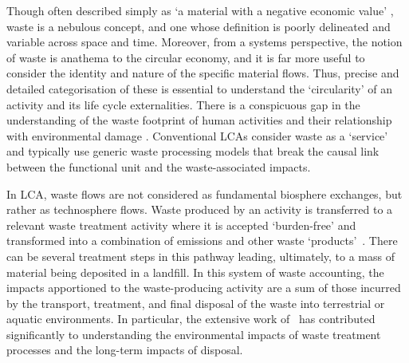 Though often described simply as `a material with a negative economic value' \citep{guinee2004economicallocation}, waste is a nebulous concept, and one whose definition is poorly delineated and variable across space and time.  Moreover, from a systems perspective, the notion of waste is anathema to the circular economy, and it is far more useful to consider the identity and nature of the specific material flows. Thus, precise and detailed categorisation of these is essential to understand the `circularity' of an activity and its life cycle externalities. There is a conspicuous gap in the understanding of the waste footprint of human activities and their relationship with environmental damage \citep{laurenti2023wastefootprint}. Conventional LCAs consider waste as a `service' \citep{guinee2021wasteisnotaservice} and typically use generic waste processing models \citep{beylot2018} that break the causal link between the functional unit and the waste-associated impacts.

In LCA, waste flows are not considered as fundamental biosphere exchanges, but rather as technosphere flows. Waste produced by an activity is transferred to a relevant waste treatment activity where it is accepted `burden-free' and transformed into a combination of emissions and other waste `products'~\citep{guinee2021wasteisnotaservice}. There can be several treatment steps in this pathway leading, ultimately, to a mass of material being deposited in a landfill. In this system of waste accounting, the impacts apportioned to the waste-producing activity are a sum of those incurred by the transport, treatment, and final disposal of the waste into terrestrial or aquatic environments. In particular, the extensive work of~\cite{doka2024publications} has contributed significantly to understanding the environmental impacts of waste treatment processes and the long-term impacts of disposal.

